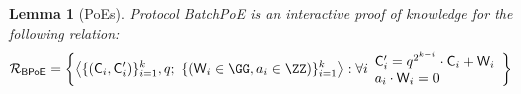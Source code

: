\documentclass[12pt]{article}
\theoremstyle{Definition}
\newtheorem{lemma}{Lemma}
\begin{document}
	\begin{lemma}[PoEs]
		Protocol \textsf{BatchPoE} is an interactive proof of knowledge for the following relation:
		\[ \mathcal{R_\textsf{BPoE}} = \left\{
\big\langle \{(\gr{C}_i,\gr{C}_i')\}_{i=1}^{\numrounds}, q ; \ \{(\gr{W}_i\in \GG, a_i \in \ZZ)\}_{i=1}^k  \big\rangle
: \forall i
\begin{array}{l} 
 \gr{C}_i' = q^{2^{\numrounds-i}}  \cdot \gr{C}_i + \gr{W}_i \\ 
a_i\cdot \gr{W}_i=0
\end{array}\right\}
\]


	\end{lemma}
\end{document}
